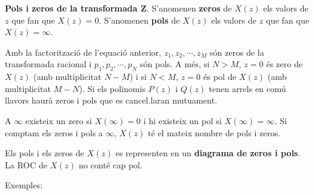 \documentclass{article}
\begin{document}
\vskip 0.3cm
\noindent
\textbf{Pols i zeros de la transformada Z}. S'anomenen \textbf{zeros} de $X(z)$ els valors de $z$ que fan
que $X(z)=0$. S'anomenen \textbf{pols} de $X(z)$ els valors de $z$ que fan que $X(z)=\infty$. 


\vskip 0.3cm
\noindent
Amb la factoritzaci\'o de l'equaci\'o anterior, $z_1, z_2, \cdots, z_M$ s\'on zeros de la transformada racional
i $p_1, p_2, \cdots, p_N$ s\'on pols. A m\'es, si $N > M$, $z=0$ \'es zero de $X(z)$ (amb multiplicitat $N-M$) 
i si $N < M$, $z=0$ \'es pol de $X(z)$ (amb multiplicitat $M-N$). Si els polinomis $P(z)$ i $Q(z)$ tenen arrels
en com\'u llavors haur\`a zeros i pols que es cancel.laran mutuament.

\vskip 0.3cm
\noindent
A $\infty$ existeix un zero si $X(\infty)=0$ i hi existeix un pol si $X(\infty)=\infty$. Si comptam els zeros
i pols a $\infty$, $X(z)$ t\'e el mateix nombre de pols i zeros.

\vskip 0.3cm
\noindent
Els pols i els zeros de $X(z)$ es representen en un \textbf{diagrama de zeros i pols}. La ROC de $X(z)$ no
cont\'e cap pol.

\vskip 0.3cm
\noindent
Exemples:
\end{document}
